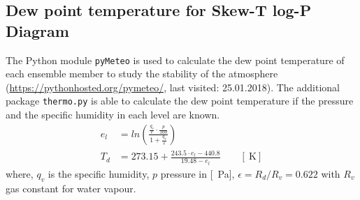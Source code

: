 \subsection{Dew point temperature for Skew-T log-P Diagram}
The Python module \texttt{pyMeteo} is used to calculate the dew point temperature of each ensemble member to study the stability of the atmosphere (\url{https://pythonhosted.org/pymeteo/}, last visited: 25.01.2018). The additional package \texttt{thermo.py} is able to calculate the dew point temperature if the pressure and the specific humidity in each level are known. 
\begin{align}
	e_l & = ln\left( \frac{\frac{q_v}{\epsilon} \cdot \frac{p}{100}}{1 + \frac{q_v}{\epsilon}} \right) \\
	T_d & = 273.15 + \frac{243.5 \cdot e_l -440.8}{19.48 -e_l} \qquad [\SI{}{\kelvin}]
\end{align}
where, $q_v$ is the specific humidity, $p$ pressure in [\SI{}{\Pa}], $\epsilon = R_d / R_v = 0.622$ with $R_v$ gas constant for water vapour.

